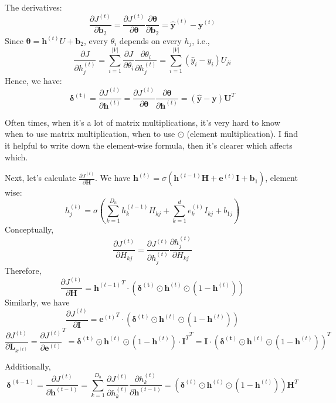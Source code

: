 \documentclass[12pt]{article}
\begin{document}
The derivatives:
$$
\frac{\partial J^{(t)}}{\partial \bm b_2} = \frac{\partial J^{(t)}}{\partial \bm \theta} \frac{\partial \bm \theta}{\partial \bm b_2} = \bm {\hat y}^{(t)} - \bm y^{(t)}
$$
Since $\bm \theta = \bm h^{(t)} U + \bm b_2$, every $\theta_i$ depends on every $h_j$, i.e.,
$$
\frac{\partial J}{\partial h_j^{(t)}} = \sum_{i=1}^{|V|} \frac{\partial J}{\partial \theta_i} \frac{\partial \theta_i}{\partial h_j^{(t)}} = \sum_{i=1}^{|V|} (\hat y_i - y_i) U_{ji}
$$
Hence, we have:
$$
\bm {\delta ^{(t)}} = \frac{\partial J^{(t)}}{\partial \bm h^{(t)}} =  \frac{\partial J^{(t)}}{\partial \bm \theta} \frac{\partial \bm \theta}{\partial \bm h^{(t)}} = (\bm {\hat y} - \bm y) \bm U^{T}
$$

Often times, when it's a lot of matrix multiplications, it's very hard to know when to use matrix multiplication, when to use $\odot$ (element multiplication). I find it helpful to write down the element-wise formula, then it's clearer which affects which. 

Next, let's calculate $\frac{\partial J^{(t)}}{\partial \bm H}$. We have $\bm h^{(t)} = \sigma (\bm h^{(t-1)} \bm H + \bm e^{(t)} \bm I + \bm b_1)$, element wise:
$$
h_j^{(t)} = \sigma \left(  \sum_{k=1}^{D_n} h_k^{(t-1)} H_{kj} + \sum_{k=1}^{d} e_k^{(t)} I_{kj} + b_{1j}\right)
$$
Conceptually,
$$
\frac{\partial J^{(t)}}{\partial H_{kj}} = \frac{\partial J^{(t)}}{\partial h_j^{(t)}} \frac{\partial h_j^{(t)}}{\partial H_{kj}}  
$$
Therefore, 
$$
\frac{\partial J^{(t)}}{\partial \bm H} = {\bm h^{(t-1)}}^T \cdot \left (\bm {\delta ^{(t)}} \odot \bm h^{(t)} \odot \left (1- \bm h^{(t)} \right) \right )
$$
Similarly, we have 
$$
\frac{\partial J^{(t)}}{\partial \bm I} = {\bm e^{(t)}}^T \cdot \left (\bm {\delta ^{(t)}} \odot \bm h^{(t)} \odot \left (1- \bm h^{(t)} \right) \right )
$$
$$
\frac{\partial J^{(t)}}{\partial \bm L_{x^{(t)}}} ={ \frac{\partial J^{(t)}}{\partial \bm e^{(t)}} }^T={ \bm {\delta ^{(t)}} \odot \bm h^{(t)} \odot \left (1- \bm h^{(t)} \right ) \cdot \bm I^T}^T = \bm I \cdot \left (\bm {\delta ^{(t)}} \odot \bm h^{(t)} \odot \left (1- \bm h^{(t)} \right ) \right)^T
$$

Additionally, 
$$
\bm {\delta ^{(t-1)}} = \frac{\partial J^{(t)}}{\partial \bm h^{(t-1)}} =  \sum_{k=1}^{D_h} \frac{\partial J^{(t)}}{\partial h_k^{(t)}} \frac{\partial h_k^{(t)}}{\partial \bm h^{(t-1)}} = \left(\bm \delta^{(t)}  \odot \bm h^{(t)} \odot \left (1- \bm h^{(t)} \right) \right) \bm H^T
$$
\end{document}
